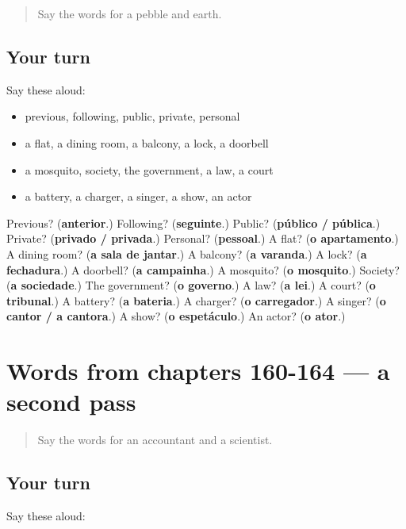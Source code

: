 \begin{quote}
Say the words for a pebble and earth.
\end{quote}

\subsection*{Your turn}
Say these aloud:

\begin{itemize}
\raggedright
  \item previous, following, public, private, personal
  \item a flat, a dining room, a balcony, a lock, a doorbell
  \item a mosquito, society, the government, a law, a court
  \item a battery, a charger, a singer, a show, an actor
\end{itemize}

\begin{tcolorbox}[breakable,colback=teal!4,colframe=teal!35!black,title={Before you move on}]
Previous? (\textbf{anterior}.) Following? (\textbf{seguinte}.) Public? (\textbf{público / pública}.) Private? (\textbf{privado / privada}.) Personal? (\textbf{pessoal}.) A flat? (\textbf{o apartamento}.) A dining room? (\textbf{a sala de jantar}.) A balcony? (\textbf{a varanda}.) A lock? (\textbf{a fechadura}.) A doorbell? (\textbf{a campainha}.) A mosquito? (\textbf{o mosquito}.) Society? (\textbf{a sociedade}.) The government? (\textbf{o governo}.) A law? (\textbf{a lei}.) A court? (\textbf{o tribunal}.) A battery? (\textbf{a bateria}.) A charger? (\textbf{o carregador}.) A singer? (\textbf{o cantor / a cantora}.) A show? (\textbf{o espetáculo}.) An actor? (\textbf{o ator}.)
\end{tcolorbox}
\section[(dialogue)]{Words from chapters 160-164 — a second pass}

\label{lesson:PT-R164-second-pass-words-from-chapters-160-164}



\begin{quote}
Say the words for an accountant and a scientist.
\end{quote}

\subsection*{Your turn}
Say these aloud:

